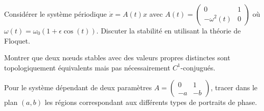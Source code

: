\begin{exercice}
Consid\'erer le syst\`eme p\'eriodique $\dot{x} = A(t)x$ avec
$A(t) = \begin{pmatrix} 0 & 1 \\ -\omega^2(t) & 0 \end{pmatrix}$
o\`u $\omega(t) = \omega_0(1 + \epsilon\cos(t))$. Discuter la stabilit\'e
en utilisant la th\'eorie de Floquet.
\end{exercice}

\begin{exercice}
Montrer que deux n\oe uds stables avec des valeurs propres distinctes sont
topologiquement \'equivalents mais pas n\'ecessairement $C^1$-conjugu\'es.
\end{exercice}

\begin{exercice}
Pour le syst\`eme d\'ependant de deux param\`etres
$A = \begin{pmatrix} 0 & 1 \\ -a & -b \end{pmatrix}$,
tracer dans le plan $(a, b)$ les r\'egions correspondant aux diff\'erents
types de portraits de phase.
\end{exercice}
